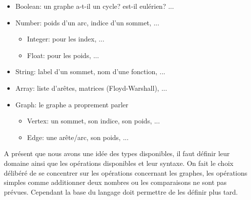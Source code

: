 \documentclass[french]{article}
\begin{document}
				\begin{itemize}
					\item Boolean: un graphe a-t-il un cycle? est-il eulérien? ...
					\item Number: poids d'un arc, indice d'un sommet, ...
					\begin{itemize}
						\item Integer: pour les index, ...
						\item Float: pour les poids, ...
					\end{itemize}
					\item String: label d'un sommet, nom d'une fonction, ...
					\item Array: liste d'arêtes, matrices (Floyd-Warshall), ...
					\item Graph: le graphe a proprement parler
					\begin{itemize}
						\item Vertex: un sommet, son indice, son poids, ...
						\item Edge: une arête/arc, son poids, ...
					\end{itemize}
				\end{itemize} 
				
			A présent que nous avons une idée des types disponibles, il faut définir leur domaine ainsi que les opérations disponibles et leur syntaxe. On fait le choix délibéré de se concentrer sur les opérations concernant les graphes, les opérations simples comme additionner deux nombres ou les comparaisons ne sont pas prévues. Cependant la base du langage doit permettre de les définir plus tard. 
			
\end{document}
